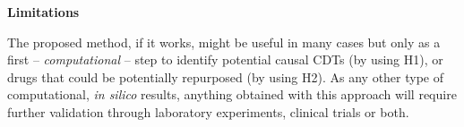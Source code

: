 \textbf{Limitations}


The proposed method, if it works, might be useful in many cases but only as a first -- \emph{computational} -- step to identify potential  causal CDTs (by using  H1), or drugs that could be potentially repurposed (by using H2). As any other type of computational, \textit{in silico} results, anything obtained with this approach will require further validation through laboratory experiments, clinical trials or both.

%
%

